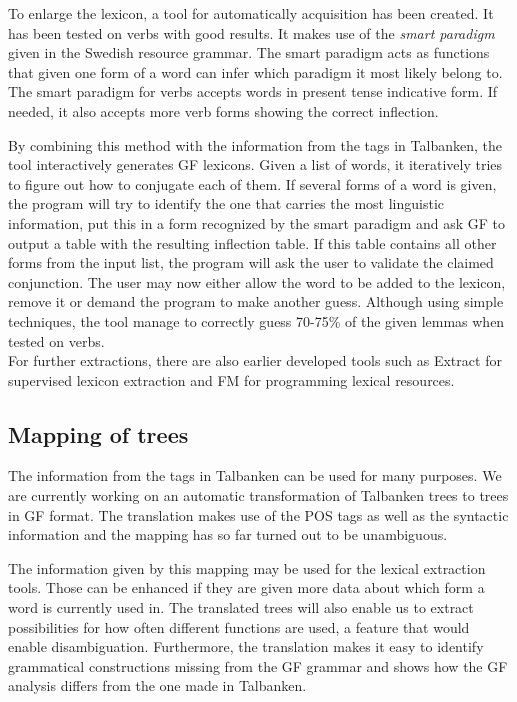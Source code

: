 \documentclass[submission]{eptcs} %
\begin{document}
To enlarge the lexicon, 
a tool for automatically acquisition has been created. It has 
been tested on verbs with good results. It makes use of
the \emph{smart paradigm} given in the Swedish resource grammar.
The smart paradigm acts as functions that given one form of a word can
infer which paradigm it most likely belong to.
The smart paradigm for verbs accepts words in present tense indicative form.
If needed, it also accepts more verb forms showing the correct inflection.

By combining this method with the information from the tags in Talbanken,
the tool interactively generates GF lexicons. 
Given a list of words, it iteratively
tries to figure out how to conjugate each of them. If several forms of a word is 
given, the program will try to identify the one that carries the most linguistic
information, put this in a form recognized by the smart paradigm and ask GF to output
a table with the resulting inflection table. 
If this table contains all other forms from the input list,
the program will ask the  user to
validate the claimed conjunction. The user may now either
allow the word to be added to the lexicon, remove it or demand the program
to make another guess.
Although using simple techniques, the tool 
manage to correctly guess 70-75\% of the given lemmas when tested on
verbs. \\
For further extractions, there are also earlier developed tools such as
Extract\cite{extract} for supervised lexicon extraction and
FM\cite{fm} for programming lexical resources.



\subsection{Mapping of trees}
The information from the tags in Talbanken can be used for many purposes.
We are currently working on an automatic transformation of Talbanken trees 
to trees in GF format. The translation makes use of the POS tags as well as
the syntactic information and the mapping has so far turned out to be unambiguous. 

The information given by this mapping may be used for the lexical extraction
tools. Those can be enhanced if they are given more data about which form a word is
currently used in. 
The translated trees will also enable us to extract possibilities for how often
different functions are used, a feature that would enable disambiguation.
Furthermore, the translation makes it easy to identify grammatical constructions
missing from the GF grammar and shows how the GF analysis differs from the one made
in Talbanken.
\end{document}
